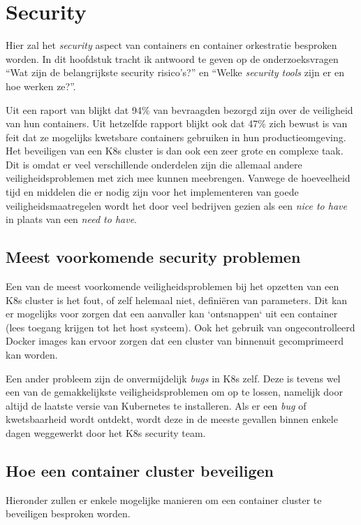 \section{Security}

Hier zal het \textit{security} aspect van containers en container orkestratie besproken worden. In dit hoofdstuk tracht ik antwoord te geven op de onderzoeksvragen ``Wat zijn de belangrijkste security risico's?'' en ``Welke \textit{security tools} zijn er en hoe werken ze?''.

Uit een raport van \textcite{Tripwire2019} blijkt dat 94\% van bevraagden bezorgd zijn over de veiligheid van hun containers. Uit hetzelfde rapport blijkt ook dat 47\% zich bewust is van feit dat ze mogelijks kwetsbare containers gebruiken in hun productieomgeving. Het beveiligen van een K8s cluster is dan ook een zeer grote en complexe taak. Dit is omdat er veel verschillende onderdelen zijn die allemaal andere veiligheidsproblemen met zich mee kunnen meebrengen. Vanwege de hoeveelheid tijd en middelen die er nodig zijn voor het implementeren van goede veiligheidsmaatregelen wordt het door veel bedrijven gezien als een \textit{nice to have} in plaats van een \textit{need to have}.

\subsection{Meest voorkomende security problemen}
Een van de meest voorkomende veiligheidsproblemen bij het opzetten van een K8s cluster is het fout, of zelf helemaal niet, definiëren van parameters. Dit kan er mogelijks voor zorgen dat een aanvaller kan `ontsnappen` uit een container (lees toegang krijgen tot het host systeem). Ook het gebruik van ongecontrolleerd Docker images kan ervoor zorgen dat een cluster van binnenuit gecomprimeerd kan worden.

Een ander probleem zijn de onvermijdelijk \textit{bugs} in K8s zelf. Deze is tevens wel een van de gemakkelijkste veiligheidsproblemen om op te lossen, namelijk door altijd de laatste versie van Kubernetes te installeren. Als er een \textit{bug} of kwetsbaarheid wordt ontdekt, wordt deze in de meeste gevallen binnen enkele dagen weggewerkt door het K8s security team.

\subsection{Hoe een container cluster beveiligen}
Hieronder zullen er enkele mogelijke manieren om een container cluster te beveiligen besproken worden.

